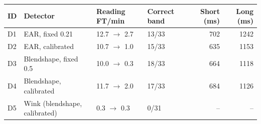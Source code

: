\begin{tabular}{llllrr}
\toprule
ID & Detector & Reading FT/min & Correct band & Short (ms) & Long (ms) \\
\midrule
D1 & EAR, fixed 0.21 & 12.7 $\to$ 2.7 & 13/33 & 702 & 1242 \\
D2 & EAR, calibrated & 10.7 $\to$ 1.0 & 15/33 & 635 & 1153 \\
D3 & Blendshape, fixed 0.5 & 10.0 $\to$ 0.3 & 18/33 & 664 & 1118 \\
D4 & Blendshape, calibrated & 11.7 $\to$ 2.0 & 17/33 & 684 & 1126 \\
D5 & Wink (blendshape, calibrated) & 0.3 $\to$ 0.3 & 0/31 & -- & -- \\
\bottomrule
\end{tabular}
